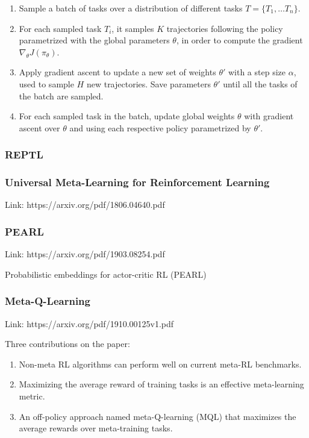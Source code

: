 \documentclass[12pt, english]{article}
\begin{document}
\begin{enumerate}
  \item Sample a batch of tasks over a distribution of different tasks $T = \{T_1, \dots T_n\}$.
  \item For each sampled task $T_i$, it samples $K$ trajectories following the policy parametrized with the global parameters $\theta$, in order to compute the gradient $\nabla_\theta J(\pi_\theta)$.
  \item Apply gradient ascent to update a new set of weights $\theta'$ with a step size $\alpha$, used to sample $H$ new trajectories. Save parameters $\theta'$ until all the tasks of the batch are sampled.
  \item For each sampled task in the batch, update global weights $\theta$ with gradient ascent over $\theta$ and using each respective policy parametrized by $\theta'$.
\end{enumerate}


\subsubsection{REPTL}


\subsubsection{Universal Meta-Learning for Reinforcement Learning}

Link: https://arxiv.org/pdf/1806.04640.pdf


\subsubsection{PEARL}

Link: https://arxiv.org/pdf/1903.08254.pdf

Probabilistic embeddings for actor-critic RL (PEARL)

\subsubsection{Meta-Q-Learning}

Link: https://arxiv.org/pdf/1910.00125v1.pdf

Three contributions on the paper:

\begin{enumerate}
  \item Non-meta RL algorithms can perform well on current meta-RL benchmarks.
  \item Maximizing the average reward of training tasks is an effective meta-learning metric.
  \item An off-policy approach named meta-Q-learning (MQL) that maximizes the average rewards over meta-training tasks.
\end{enumerate}
\end{document}
